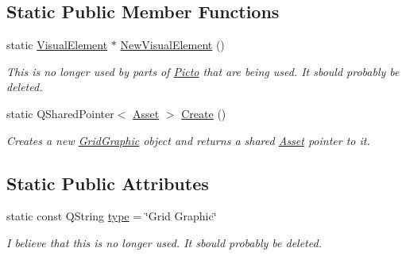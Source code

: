 \subsection*{Static Public Member Functions}
\begin{DoxyCompactItemize}
\item 
\hypertarget{class_picto_1_1_grid_graphic_aba09b26ba7ef2b25874b17ee37ff35ea}{static \hyperlink{struct_picto_1_1_visual_element}{Visual\-Element} $\ast$ \hyperlink{class_picto_1_1_grid_graphic_aba09b26ba7ef2b25874b17ee37ff35ea}{New\-Visual\-Element} ()}\label{class_picto_1_1_grid_graphic_aba09b26ba7ef2b25874b17ee37ff35ea}

\begin{DoxyCompactList}\small\item\em This is no longer used by parts of \hyperlink{namespace_picto}{Picto} that are being used. It sbould probably be deleted. \end{DoxyCompactList}\item 
\hypertarget{class_picto_1_1_grid_graphic_aa6aa56d1894399c5ebd38872945008dd}{static Q\-Shared\-Pointer$<$ \hyperlink{class_picto_1_1_asset}{Asset} $>$ \hyperlink{class_picto_1_1_grid_graphic_aa6aa56d1894399c5ebd38872945008dd}{Create} ()}\label{class_picto_1_1_grid_graphic_aa6aa56d1894399c5ebd38872945008dd}

\begin{DoxyCompactList}\small\item\em Creates a new \hyperlink{class_picto_1_1_grid_graphic}{Grid\-Graphic} object and returns a shared \hyperlink{class_picto_1_1_asset}{Asset} pointer to it. \end{DoxyCompactList}\end{DoxyCompactItemize}
\subsection*{Static Public Attributes}
\begin{DoxyCompactItemize}
\item 
\hypertarget{class_picto_1_1_grid_graphic_af77f3082edec872510d96e0b92b91b0b}{static const Q\-String \hyperlink{class_picto_1_1_grid_graphic_af77f3082edec872510d96e0b92b91b0b}{type} = \char`\"{}Grid Graphic\char`\"{}}\label{class_picto_1_1_grid_graphic_af77f3082edec872510d96e0b92b91b0b}

\begin{DoxyCompactList}\small\item\em I believe that this is no longer used. It sbould probably be deleted. \end{DoxyCompactList}\end{DoxyCompactItemize}
